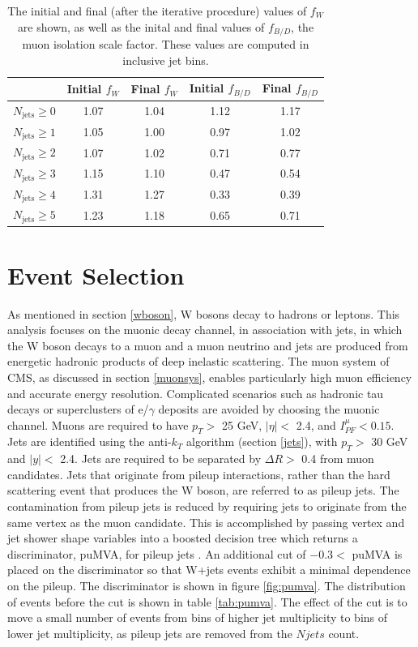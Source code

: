 \documentclass[oneside, letterpaper, oldfontcommands]{memoir}
\begin{document}
\begin{table}
\centering
\caption{The initial and final (after the iterative procedure) values of $f_{W}$ are shown, as well as the inital and final values of $f_{B/D}$, the muon isolation scale factor. These values are computed in inclusive jet bins.}
\footnotesize{
\begin{tabular}{l|cccc}
  &  Initial $f_{W}$ & Final $f_{W}$ & Initial $f_{B/D}$ & Final $f_{B/D}$ \\ \hline
   $N_{\text{jets}} \geq 0$        & 1.07 & 1.04 & 1.12 & 1.17 \\
   $N_{\text{jets}} \geq 1$        & 1.05 & 1.00 & 0.97 & 1.02 \\
   $N_{\text{jets}} \geq 2$        & 1.07 & 1.02 & 0.71 & 0.77 \\
   $N_{\text{jets}} \geq 3$        & 1.15 & 1.10 & 0.47 & 0.54 \\
   $N_{\text{jets}} \geq 4$        & 1.31 & 1.27 & 0.33 & 0.39 \\
   $N_{\text{jets}} \geq 5$        & 1.23 & 1.18 & 0.65 & 0.71 \\
 \hline
 \end{tabular}}
\label{tab:qcdfactorsinc}
\end{table}
 
\section{Event Selection}
\qquad As mentioned in section \ref{wboson}, W bosons decay to hadrons or leptons. This analysis focuses on the muonic decay channel, in association with jets, in which the W boson decays to a muon and a muon neutrino and jets are produced from energetic hadronic products of deep inelastic scattering. The muon system of CMS, as discussed in section \ref{muonsys}, enables particularly high muon efficiency and accurate energy resolution. Complicated scenarios such as hadronic tau decays or superclusters of e/$\gamma$ deposits are avoided by choosing the muonic channel. Muons are required to have $p_{T} >$ 25 GeV, $|\eta| <$ 2.4, and $I_{PF}^{\mu} < 0.15$. Jets are identified using the anti-$k_{T}$ algorithm (section \ref{jets}), with $p_{T} >$ 30 GeV and $|y| <$ 2.4. Jets are required to be separated by $\Delta R >$ 0.4 from muon candidates. Jets that originate from pileup interactions, rather than the hard scattering event that produces the W boson, are referred to as pileup jets. The contamination from pileup jets is reduced by requiring jets to originate from the same vertex as the muon candidate. This is accomplished by passing vertex and jet shower shape variables into a boosted decision tree which returns a discriminator, puMVA, for pileup jets \cite{CMS-PAS-JME-13-005}. An additional cut of $-0.3 <$ puMVA is placed on the discriminator so that W+jets events exhibit a minimal dependence on the pileup. The discriminator is shown in figure \ref{fig:pumva}. The distribution of events before the cut is shown in table \ref{tab:pumva}. The effect of the cut is to move a small number of events from bins of higher jet multiplicity to bins of lower jet multiplicity, as pileup jets are removed from the $Njets$ count. 
\end{document}
